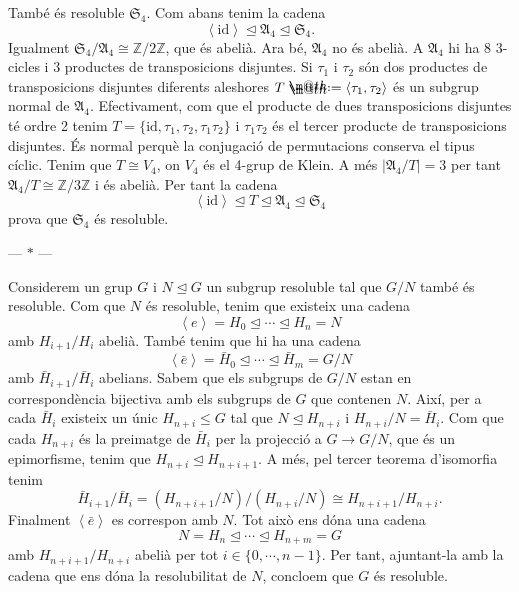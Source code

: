 \documentclass[12pt]{article}
\makeatletter
\renewcommand{\S}{\mathfrak{S}}
\newcommand{\A}{\mathfrak{A}}
\newcommand{\Z}{\mathbb{Z}}
\newcommand{\gen}[1]{\left\langle #1 \right\rangle}
\newcommand{\abs}[1]{\left\lvert #1 \right\rvert}
\newcommand{\normal}{\trianglelefteq}
\newcommand{\id}{\mathrm{id}}
\newcommand{\parbreak}{
	\begin{center}
		--- $\ast$ ---
	\end{center} 
}
\newcommand*{\defeq}{\mathrel{\rlap{%
    \raisebox{0.3ex}{$\m@th\cdot$}}%
  \raisebox{-0.3ex}{$\m@th\cdot$}}%
=}
\makeatother
\begin{document}
També és resoluble \( \S_4 \). Com abans tenim la cadena 
\begin{equation*}
	\gen{\id} \normal \A_4 \normal \S_4.
\end{equation*}
Igualment \( \S_4 / \A_4 \cong \Z / 2\Z \), que és abelià. Ara bé, \( \A_4 \) no és abelià. A \( \A_4 \) hi ha 8 3-cicles i 3 productes de transposicions disjuntes. Si \( \tau_1 \) i \( \tau_2 \) són dos productes de transposicions disjuntes diferents aleshores \( T \defeq \gen{\tau_1, \tau_2} \) és un subgrup normal de \( \A_4 \). Efectivament, com que el producte de dues transposicions disjuntes té ordre 2 tenim \( T = \{ \id, \tau_1, \tau_2, \tau_1 \tau_2 \} \) i \( \tau_1\tau_2 \) és el tercer producte de transposicions disjuntes. És normal perquè la conjugació de permutacions conserva el tipus cíclic. Tenim que \( T \cong V_4 \), on \( V_4 \) és el 4-grup de Klein. A més \( \abs{\A_4 / T} = 3 \) per tant \( \A_4 / T \cong \Z/3\Z \) i és abelià. Per tant la cadena
\begin{equation*}
	\gen{\id} \normal T \normal \A_4 \normal \S_4
\end{equation*}
prova que \( \S_4 \) és resoluble. 

\parbreak

Considerem un grup \( G \) i \( N \normal G \) un subgrup resoluble tal que \( G/N \) també és resoluble. Com que \( N \) és resoluble, tenim que existeix una cadena 
\begin{equation*}
	\gen{e} = H_0 \normal \cdots \normal H_n = N
\end{equation*}
amb \( H_{i+1} / H_i \) abelià. També tenim que hi ha una cadena 
\begin{equation*}
	\gen{\bar{e}} = \bar{H}_0 \normal \cdots \normal \bar{H}_m = G/N
\end{equation*}
amb \( \bar{H}_{i+1} / \bar{H}_i \) abelians. Sabem que els subgrups de \( G/N \) estan en correspondència bijectiva amb els subgrups de \( G \) que contenen \( N \). Així, per a cada \( \bar{H}_i \) existeix un únic \( H_{n+i} \leq G \) tal que \( N \normal H_{n+i} \) i \( H_{n+i}/N = \bar{H}_i \). Com que cada \( H_{n+i} \) és la preimatge de \( \bar{H}_i \) per la projecció a \( G \to G/N \), que és un epimorfisme, tenim que \( H_{n+i} \normal H_{n+i+1} \). A més, pel tercer teorema d'isomorfia tenim
\begin{equation*}
	\bar{H}_{i+1}/\bar{H}_i = (H_{n+i+1}/N)/(H_{n+i}/N) \cong H_{n+i+1}/H_{n+i}.
\end{equation*}
Finalment \( \gen{\bar{e}} \) es correspon amb \( N \). Tot això ens dóna una cadena
\begin{equation*}
	N = H_{n} \normal \cdots \normal H_{n+m} = G
\end{equation*}
amb \( H_{n+i+1}/H_{n+i} \)	abelià per tot \( i \in \{0, \cdots , n-1\} \). Per tant, ajuntant-la amb la cadena que ens dóna la resolubilitat de \( N \), concloem que \( G \) és resoluble. 
\end{document}
